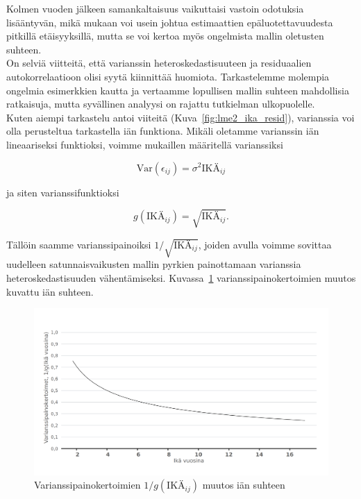 \documentclass[finnish]{docopts}
\begin{document}
Kolmen vuoden jälkeen samankaltaisuus vaikuttaisi vastoin odotuksia lisääntyvän, mikä \cite{pinheiro00} mukaan voi usein johtua estimaattien epäluotettavuudesta pitkillä etäisyyksillä, mutta se voi kertoa myös ongelmista mallin oletusten suhteen.\\

On selviä viitteitä, että varianssin heteroskedastisuuteen ja residuaalien autokorrelaatioon olisi syytä kiinnittää huomiota. Tarkastelemme molempia ongelmia esimerkkien kautta ja vertaamme lopullisen mallin suhteen mahdollisia ratkaisuja, mutta syvällinen analyysi on rajattu tutkielman ulkopuolelle.\\

Kuten aiempi tarkastelu antoi viiteitä (Kuva~\ref{fig:lme2_ika_resid}), varianssia voi olla perusteltua tarkastella iän funktiona. Mikäli oletamme varianssin iän lineaariseksi funktioksi, voimme \cite{pinheiro00} mukaillen määritellä varianssiksi

$$
\text{Var}(\epsilon_{ij}) = \sigma^2\text{IKÄ}_{ij}
$$

ja siten varianssifunktioksi

$$
g(\text{IKÄ}_{ij}) = \sqrt{\text{IKÄ}_{ij}}.
$$

Tällöin saamme varianssipainoiksi $1/\sqrt{\text{IKÄ}_{ij}}$, joiden avulla voimme sovittaa uudelleen satunnaisvaikusten mallin pyrkien painottamaan varianssia heteroskedastisuuden vähentämiseksi. Kuvassa~\ref{fig:lme2_varfunc} varianssipainokertoimien muutos kuvattu iän suhteen. \\

\begin{figure}[H]
\centering
  \includegraphics[scale=0.8]{kuvaajat/lme2_varfunc.png}
  \caption{Varianssipainokertoimien $1/g(\text{IKÄ}_{ij})$ muutos iän suhteen}
  \label{fig:lme2_varfunc}
\end{figure}
\end{document}

